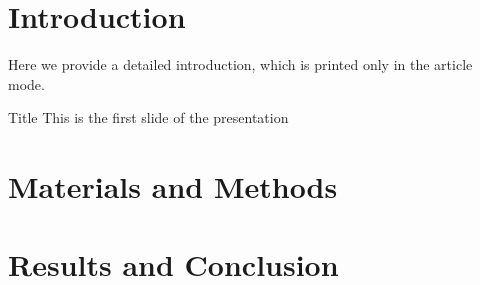 %
%


\usepackage{graphicx}          %
\usepackage{hyperref}          %
\usepackage{booktabs, caption} %
\usepackage{amsmath}
\usepackage{mhchem}            %
\usepackage{xcolor}            %


\usepackage{fontspec}
\setsansfont{Fontin}





  \section{Introduction}
    Here we provide a detailed introduction, which is printed only in the article mode.
    \begin{frame}{Title}
     This is the first slide of the presentation
    \end{frame}
  \section{Materials and Methods}
  \section{Results and Conclusion}


